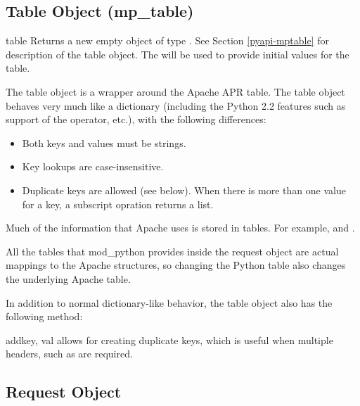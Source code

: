 \subsection{Table Object (mp_table)\label{pyapi-mptable}}

\begin{classdesc}{table}{}
Returns a new empty object of type . See Section
\ref{pyapi-mptable} for description of the table object. The
 will be used to provide initial values for
the table.  

The table object is a wrapper around the Apache APR table. The table
object behaves very much like a dictionary (including the Python 2.2
features such as support of the  operator, etc.), with the 
following differences:

\begin{itemize}
\item
Both keys and values must be strings.
\item
Key lookups are case-insensitive.
\item
Duplicate keys are allowed (see  below). When there is
more than one value for a key, a subscript opration returns a list.
\end{itemize}

Much of the information that Apache uses is stored in tables. For
example,  and .

All the tables that mod_python provides inside the request
object are actual mappings to the Apache structures, so changing the
Python table also changes the underlying Apache table.

In addition to normal dictionary-like behavior, the table object also
has the following method:

\begin{methoddesc}[table]{add}{key, val}
 allows for creating duplicate keys, which is useful 
when multiple headers, such as  are required.
\end{methoddesc}

\end{classdesc}

\subsection{Request Object\label{pyapi-mprequest}}

